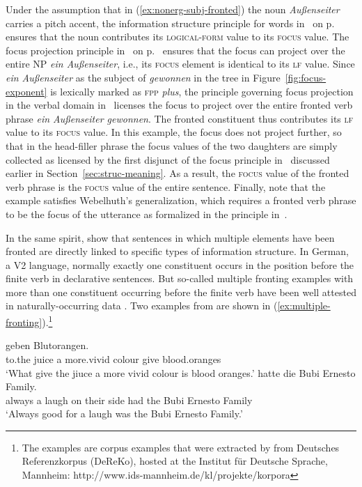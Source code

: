 \documentclass[output=paper]{langsci/langscibook}
\begin{document}
Under the assumption that in (\ref{ex:nonerg-subj-fronted})
the noun \textit{Außenseiter} carries a pitch accent, the
information structure principle for words in~ on p.~\pageref{fig:words}
ensures that the noun contributes its \textsc{logical-form} value to
its \textsc{focus} value. The focus projection principle in~ on p.~\pageref{fig:focus-projection} ensures that the focus can project
over the entire NP \textit{ein Außenseiter}, i.e., its \textsc{focus}
element is identical to its \textsc{lf} value. Since \textit{ein
  Außenseiter} as the subject of \textit{gewonnen} in the tree in
Figure~\ref{fig:focus-exponent} is lexically marked as \textsc{fpp}
\textit{plus}, the principle governing focus projection in the verbal
domain in~ licenses the focus to
project over the entire fronted verb phrase \textit{ein
  Außenseiter gewonnen}. The fronted constituent thus contributes its
\textsc{lf} value to its \textsc{focus} value. In this example, the
focus does not project further, so that in the head-filler phrase the
focus values of the two daughters are simply collected as licensed by
the first disjunct of the focus principle in~ discussed earlier in
Section~\ref{sec:struc-meaning}. As a result, the \textsc{focus} value
of the fronted verb phrase is the \textsc{focus} value of the
entire sentence. Finally, note that the example satisfies Webelhuth's
generalization, which requires a fronted verb phrase to be the
focus of the utterance as formalized in the principle in~.

In the same spirit, \cite{BC2010a} show that sentences in which
multiple elements have been fronted  are directly linked to specific
types of information structure. In German, a V2 language, normally
exactly one constituent occurs in the position before the finite verb
in declarative sentences. But so-called multiple fronting examples
with more than one constituent occurring before the finite verb have
been well attested in naturally-occurring data \citep{Mueller2003b}. Two examples from
\cite{BC2010a} are shown in (\ref{ex:multiple-fronting}).\footnote{The examples are corpus examples that were extracted by \cite{BC2010a} from Deutsches Referenzkorpus (DeReKo), hosted at the Institut für Deutsche Sprache, Mannheim: http://www.ids-mannheim.de/kl/projekte/korpora}
\begin{exe}
  \ex\label{ex:multiple-fronting}
  \begin{xlist}
    \ex{} geben Blutorangen.\\
             to.the juice a more.vivid colour give blood.oranges\\
      \trans `What give the jiuce a more vivid colour is blood oranges.'
    \ex{} hatte die Bubi Ernesto Family.\\
            always a laugh on their side had the Bubi Ernesto Family\\
        \trans `Always good for a laugh was the Bubi Ernesto Family.'
  \end{xlist}

\end{exe}
\end{document}
